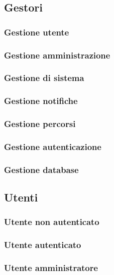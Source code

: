 \documentclass{article}
\begin{document}
\clearpage

\subsection{Gestori}

\subsubsection{Gestione utente}

\subsubsection{Gestione amministrazione}

\subsubsection{Gestione di sistema}

\subsubsection{Gestione notifiche}

\subsubsection{Gestione percorsi}

\subsubsection{Gestione autenticazione}

\subsubsection{Gestione database}

\clearpage

\subsection{Utenti}

\subsubsection{Utente non autenticato}

\subsubsection{Utente autenticato}

\subsubsection{Utente amministratore}
\end{document}
